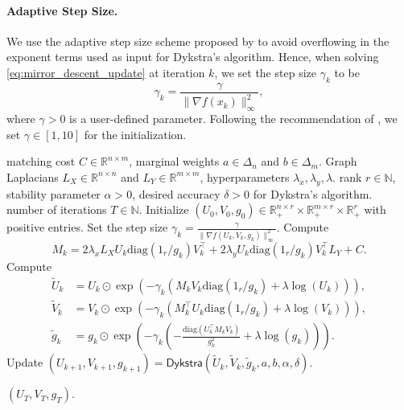 \documentclass{article}
\theoremstyle{definition}
\newcommand{\N}{\mathbb{N}}
\newcommand{\R}{\mathbb{R}}
\begin{document}
\paragraph{Adaptive Step Size.} We use the adaptive step size scheme proposed by \cite{scetbon2022low} to avoid overflowing in the exponent terms used as input for Dykstra's algorithm. Hence, when solving \eqref{eq:mirror_descent_update} at iteration $k$, we set the step size $\gamma_k$ to be
\begin{equation*}
    \gamma_k = \frac{\gamma}{\|\nabla f(x_k)\|_\infty^2},
\end{equation*}
where $\gamma > 0$ is a user-defined parameter. Following the recommendation of \cite{scetbon2022low}, we set $\gamma \in [1, 10]$ for the initialization.


\begin{algorithm}[!htbp]
    \caption{Low-Rank LapOT}
    \label{alg:lot_quad}
    \begin{algorithmic}[1]
        \Input matching cost $C \in \R^{n \times m}$, marginal weights $a \in \Delta_n$ and $b \in \Delta_m$.
        \Input Graph Laplacians $L_X \in \R^{n \times n}$ and $L_Y \in \R^{m \times m}$, hyperparameters $\lambda_x, \lambda_y, \lambda$.
        \Input rank $r \in \N$, stability parameter $\alpha > 0$, desired accuracy $\delta > 0$ for Dykstra's algorithm.
        \Input number of iterations $T \in \N$.
        \State Initialize $(U_0, V_0, g_0) \in \R_+^{n \times r} \times \R_+^{m \times r} \times \R_+^{r}$ with positive entries.
            \State Set the step size $\gamma_k = \frac{\gamma}{\|\nabla f(U_k, V_k, g_k)\|_\infty^2}$.
            \State Compute
            \begin{equation*}
                M_k = 2 \lambda_x L_X U_k \mathrm{diag}(1_r / g_k) V_k^\top + 2 \lambda_y U_k \mathrm{diag}(1_r / g_k) V_k^\top L_Y + C.
            \end{equation*}
            \State Compute
            \begin{align*}
                \tilde{U}_k & = U_k \odot \exp\left(-\gamma_k \left(M_k V_k \mathrm{diag}(1_r / g_k) + \lambda \log(U_k)\right)\right), \\
                \tilde{V}_k & = V_k \odot \exp\left(-\gamma_k \left(M_k^\top U_k \mathrm{diag}(1_r / g_k) + \lambda \log(V_k)\right)\right), \\
                \tilde{g}_k & = g_k \odot \exp\left(-\gamma_k \left(- \frac{\mathrm{diag}(U_k^\top M_k V_k)}{g_k^2} + \lambda \log(g_k)\right)\right).
            \end{align*}
            \State Update $(U_{k + 1}, V_{k + 1}, g_{k + 1}) = \mathsf{Dykstra}(\tilde{U}_k, \tilde{V}_k, \tilde{g}_k, a, b, \alpha, \delta)$.
        \EndFor
    
        \Return \((U_T, V_T, g_T)\).
    \end{algorithmic}
\end{algorithm}
\end{document}
